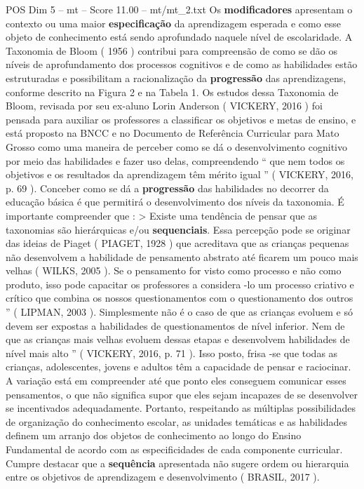 \begin{textsample}{POS Dim 5 – mt – Score 11.00 – mt/mt\_2.txt}
Os \textbf{modificadores} apresentam o contexto ou uma maior \textbf{especificação} da aprendizagem esperada e como esse objeto de conhecimento está sendo aprofundado naquele nível de escolaridade.
A Taxonomia de Bloom ( 1956 ) contribui para compreensão de como se dão os níveis de aprofundamento dos processos cognitivos e de como as habilidades estão estruturadas e possibilitam a racionalização da \textbf{progressão} das aprendizagens, conforme descrito na Figura 2 e na Tabela 1.
Os estudos dessa Taxonomia de Bloom, revisada por seu ex-aluno Lorin Anderson ( VICKERY, 2016 ) foi pensada para auxiliar os professores a classificar os objetivos e metas de ensino, e está proposto na BNCC e no Documento de Referência Curricular para Mato Grosso como uma maneira de perceber como se dá o desenvolvimento cognitivo por meio das habilidades e fazer uso delas, compreendendo “ que nem todos os objetivos e os resultados da aprendizagem têm mérito igual ” ( VICKERY, 2016, p. 69 ).
Conceber como se dá a \textbf{progressão} das habilidades no decorrer da educação básica é que permitirá o desenvolvimento dos níveis da taxonomia.
É importante compreender que : > Existe uma tendência de pensar que as taxonomias são hierárquicas e/ou \textbf{sequenciais}.
Essa percepção pode se originar das ideias de Piaget ( PIAGET, 1928 ) que acreditava que as crianças pequenas não desenvolvem a habilidade de pensamento abstrato até ficarem um pouco mais velhas ( WILKS, 2005 ).
Se o pensamento for visto como processo e não como produto, isso pode capacitar os professores a considera -lo um processo criativo e crítico que combina os nossos questionamentos com o questionamento dos outros ” ( LIPMAN, 2003 ).
Simplesmente não é o caso de que as crianças evoluem e só devem ser expostas a habilidades de questionamentos de nível inferior.
Nem de que as crianças mais velhas evoluem dessas etapas e desenvolvem habilidades de nível mais alto ” ( VICKERY, 2016, p. 71 ).
Isso posto, frisa -se que todas as crianças, adolescentes, jovens e adultos têm a capacidade de pensar e raciocinar.
A variação está em compreender até que ponto eles conseguem comunicar esses pensamentos, o que não significa supor que eles sejam incapazes de se desenvolver se incentivados adequadamente.
Portanto, respeitando as múltiplas possibilidades de organização do conhecimento escolar, as unidades temáticas e as habilidades definem um arranjo dos objetos de conhecimento ao longo do Ensino Fundamental de acordo com as especificidades de cada componente curricular.
Cumpre destacar que a \textbf{sequência} apresentada não sugere ordem ou hierarquia entre os objetivos de aprendizagem e desenvolvimento ( BRASIL, 2017 ).

\end{textsample}
